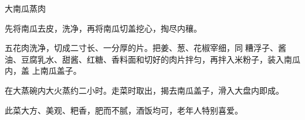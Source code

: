 \begin{recipe}[一品南瓜蒸肉]{大南瓜蒸肉}

\ingredients


\preparation

\step 先将南瓜去皮，洗净，再将南瓜切盖挖心，掏尽内穰。

\step 五花肉洗净，切成二寸长、一分厚的片。把姜、葱、花椒宰细，同𫃑糟浮子、酱
油、豆腐乳水、甜酱、红糖、香料面和切好的肉片拌匀，再拌入米粉子，装入南瓜内，盖
上南瓜盖子。

\step 在大蒸碗内大火蒸约二小时。走菜时取出，揭去南瓜盖子，滑入大盘内即成。

\features

此菜大方、美观、粑香，肥而不腻，酒饭均可，老年人特别喜爱。

\end{recipe}

